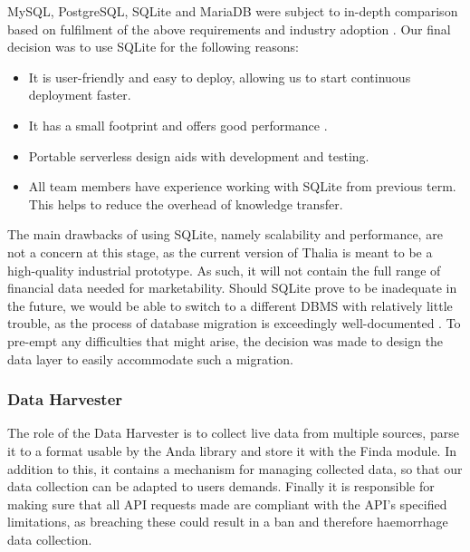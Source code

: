 \documentclass[main.tex]{subfiles}
\begin{document}
MySQL, PostgreSQL, SQLite and MariaDB were subject to in-depth comparison based on fulfilment of the above requirements and industry adoption \cite{dbPerfComparison} \cite{dbmsMarketShare}. Our final decision was to use SQLite for the following reasons:
\begin{itemize}
    \item It is user-friendly and easy to deploy, allowing us to start continuous deployment faster.
    \item It has a small footprint and offers good performance \cite{dbPerfComparison}.
    \item Portable serverless design aids with development and testing.
    \item All team members have experience working with SQLite from previous term. This helps to reduce the overhead of knowledge transfer.
\end{itemize}

The main drawbacks of using SQLite, namely scalability and performance, are not a concern at this stage, as the current version of Thalia is meant to be a high-quality industrial prototype. As such, it will not contain the full range of financial data needed for marketability. Should SQLite prove to be inadequate in the future, we would be able to switch to a different DBMS with relatively little trouble, as the process of database migration is exceedingly well-documented \cite{frameworkDataMigration} \cite{understandingDataMigration}. To pre-empt any difficulties that might arise, the decision was made to design the data layer to easily accommodate such a migration.


\subsubsection{Data Harvester}
\label{Data Harvester}

The role of the Data Harvester is to collect live data from multiple sources, parse it to a format usable by the Anda library and store it with the Finda module. In addition to this, it contains a mechanism for managing collected data, so that our data collection can be adapted to users demands. Finally it is responsible for making sure that all API requests made are compliant with the API's specified limitations, as breaching these could result in a ban and therefore haemorrhage data collection.
\end{document}
